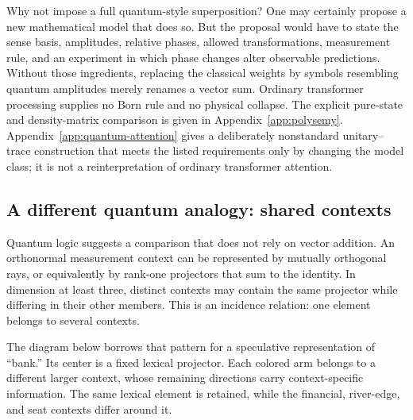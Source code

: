 \documentclass[
  aps,
  reprint,
  superscriptaddress,
  floatfix,
  nofootinbib,
  longbibliography
]{revtex4-2}
\begin{document}
Why not impose a full quantum-style superposition?  One may certainly propose
a new mathematical model that does so.  But the proposal would have to state
the sense basis, amplitudes, relative phases, allowed transformations,
measurement rule, and an experiment in which phase changes alter observable
predictions.  Without those ingredients, replacing the classical weights by
symbols resembling quantum amplitudes merely renames a vector sum.  Ordinary
transformer processing supplies no Born rule and no physical collapse.  The
explicit pure-state and density-matrix comparison is given in
Appendix~\ref{app:polysemy}.  Appendix~\ref{app:quantum-attention} gives a
deliberately nonstandard unitary--trace construction that meets the listed
requirements only by changing the model class; it is not a reinterpretation
of ordinary transformer attention.

\subsection{A different quantum analogy: shared contexts}

Quantum logic suggests a comparison that does not rely on vector addition.
An orthonormal measurement context can be represented by mutually orthogonal
rays, or equivalently by rank-one projectors that sum to the identity.  In
dimension at least three, distinct contexts may contain the same projector
while differing in their other members.  This is an incidence relation: one
element belongs to several contexts.

The diagram below borrows that pattern for a speculative representation of
``bank.''  Its center is a fixed lexical projector.  Each colored arm belongs
to a different larger context, whose remaining directions carry
context-specific information.  The same lexical element is retained, while
the financial, river-edge, and seat contexts differ around it.
\end{document}
